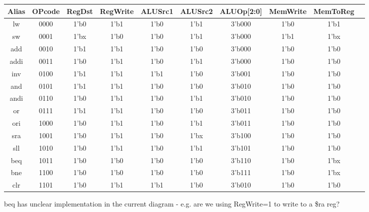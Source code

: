 \documentclass[12pt,a4paper]{article}
\begin{document}
\begin{centering}
\begin{tabular}{||c||c|c|c|c|c|c|c|c|c|}
	\hline
	\hline
	Alias & OPcode & RegDst & RegWrite & ALUSrc1 & ALUSrc2 & ALUOp[2:0] & MemWrite & MemToReg \\ \hline
	\hline
	lw    & 0000   & 1'b0   & 1'b1     & 1'b0    & 1'b1    & 3'b000     & 1'b0     & 1'b1     \\ \hline
	sw    & 0001   & 1'bx   & 1'b0     & 1'b0    & 1'b1    & 3'b000     & 1'b1     & 1'bx     \\ \hline
	add   & 0010   & 1'b1   & 1'b1     & 1'b0    & 1'b0    & 3'b000     & 1'b0     & 1'b0     \\ \hline
	addi  & 0011   & 1'b0   & 1'b1     & 1'b0    & 1'b1    & 3'b000     & 1'b0     & 1'b0     \\ \hline
	inv   & 0100   & 1'b1   & 1'b1     & 1'b1    & 1'b0    & 3'b001     & 1'b0     & 1'b0     \\ \hline
	and   & 0101   & 1'b1   & 1'b1     & 1'b0    & 1'b0    & 3'b010     & 1'b0     & 1'b0     \\ \hline
	andi  & 0110   & 1'b0   & 1'b1     & 1'b0    & 1'b1    & 3'b010     & 1'b0     & 1'b0     \\ \hline
	or    & 0111   & 1'b1   & 1'b1     & 1'b0    & 1'b0    & 3'b011     & 1'b0     & 1'b0     \\ \hline
	ori   & 1000   & 1'b0   & 1'b1     & 1'b0    & 1'b1    & 3'b011     & 1'b0     & 1'b0     \\ \hline
	sra   & 1001   & 1'b0   & 1'b1     & 1'b0    & 1'bx    & 3'b100     & 1'b0     & 1'b0     \\ \hline
	sll   & 1010   & 1'b0   & 1'b1     & 1'b0    & 1'b1    & 3'b101     & 1'b0     & 1'b0     \\ \hline
	beq   & 1011   & 1'b0   & 1'b0     & 1'b0    & 1'b0    & 3'b110     & 1'b0     & 1'bx     \\ \hline
	bne   & 1100   & 1'b0   & 1'b0     & 1'b0    & 1'b0    & 3'b111     & 1'b0     & 1'bx     \\ \hline
	clr   & 1101   & 1'b0   & 1'b1     & 1'b1    & 1'b0    & 3'b010     & 1'b0     & 1'b0     \\ \hline
\end{tabular}
\end{centering}

beq has unclear implementation in the current diagram - e.g. are we using RegWrite=1 to write to a \$ra
reg? \\
\end{document}
